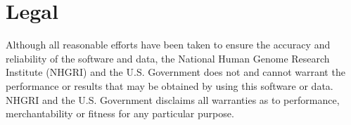 \documentclass[12pt]{article}
\begin{document}
\section{Legal} \label{sec:legal}


Although all reasonable efforts have been taken to ensure the
accuracy and reliability of the software and data, the National
Human Genome Research Institute (NHGRI) and the U.S. Government
does not and cannot warrant the performance or results that may
be obtained by using this software or data.  NHGRI and the U.S.
Government disclaims all warranties as to performance,
merchantability or fitness for any particular purpose.


\end{document}
